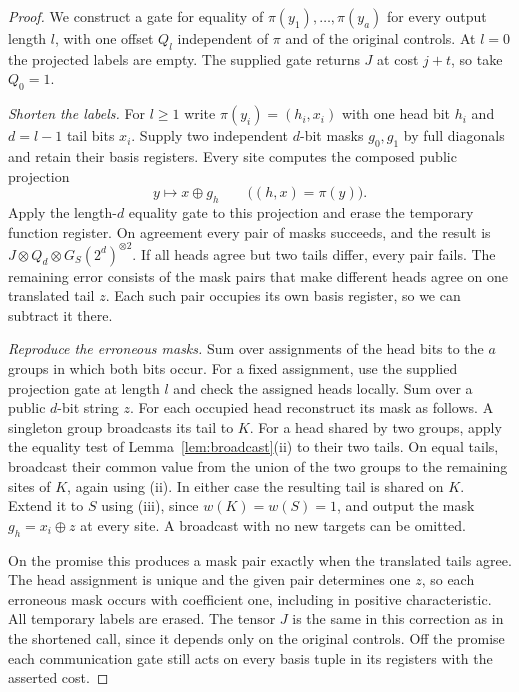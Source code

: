 \begin{proof}
We construct a gate for equality of \(\pi(y_1),\ldots,\pi(y_a)\) for
every output length \(l\), with one offset \(Q_l\) independent of
\(\pi\) and of the original controls. At \(l=0\) the projected labels
are empty. The supplied gate returns \(J\) at cost \(j+t\), so take
\(Q_0=1\).

\smallskip\noindent\emph{Shorten the labels.}
For \(l\ge1\) write \(\pi(y_i)=(h_i,x_i)\) with one head bit \(h_i\)
and \(d=l-1\) tail bits \(x_i\). Supply two independent \(d\)-bit
masks \(g_0,g_1\) by full diagonals and retain their basis registers.
Every site computes the composed public projection
\[
                  y\longmapsto x\oplus g_h
                  \qquad\bigl((h,x)=\pi(y)\bigr).
\]
Apply the length-\(d\) equality gate to this projection and erase the
temporary function register. On agreement every pair of masks
succeeds, and the result is
\(J\otimes Q_d\otimes G_S(2^d)^{\otimes 2}\).
If all heads agree but two tails differ, every pair fails. The
remaining error consists of the mask pairs that make different heads
agree on one translated tail \(z\). Each such pair occupies its own
basis register, so we can subtract it there.

\smallskip\noindent\emph{Reproduce the erroneous masks.}
Sum over assignments of the head bits to the \(a\) groups in which
both bits occur. For a fixed assignment, use the supplied projection
gate at length \(l\) and check the assigned heads locally. Sum over a
public \(d\)-bit string \(z\). For each occupied head reconstruct
its mask as follows. A singleton group broadcasts its tail to \(K\).
For a head shared by two groups, apply the equality test of
Lemma~\ref{lem:broadcast}(ii) to their two tails. On equal tails,
broadcast their common value from the union of the two groups to
the remaining sites of \(K\), again using (ii). In either case the
resulting tail is shared on \(K\). Extend it to \(S\) using (iii),
since \(w(K)=w(S)=1\), and output the mask \(g_h=x_i\oplus z\)
at every site. A broadcast with no new targets can be omitted.

On the promise this produces a mask pair exactly when the translated
tails agree. The head assignment is unique and the given pair
determines one \(z\), so each erroneous mask occurs with coefficient
one, including in positive characteristic. All temporary labels are
erased. The tensor \(J\) is the same in this correction as in the
shortened call, since it depends only on the original controls.
Off the promise each communication gate still acts on every basis
tuple in its registers with the asserted cost.


\end{proof}
